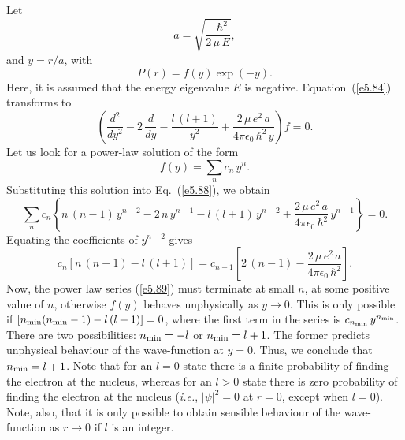 Let 
\begin{equation}\label{e5.86}
a= \sqrt{\frac{-\hbar^2}{2\,\mu \,E}},
\end{equation}
and $y=r/a$, with
  \begin{equation}\label{e5.87}
P(r) = f(y) \exp(-y).
\end{equation}
Here, it is assumed that the energy eigenvalue $E$ is negative.
Equation~(\ref{e5.84}) transforms to 
\begin{equation}\label{e5.88}
\left(\frac{d^2}{dy^2} -2\,\frac{d}{dy} -\frac{l\,(l+1)}{y^2}
+ \frac{2\,\mu\, e^2\, a}{4\pi \epsilon_0\, \hbar^2\,y}\right) f= 0.
\end{equation}
Let us look for a power-law solution of the form
\begin{equation}\label{e5.89}
f(y) = \sum_{n} c_n\, y^n.
\end{equation}
Substituting this solution into Eq.~(\ref{e5.88}), we obtain
\begin{equation}
\sum_n c_n \left\{ n\,(n-1)\,y^{n-2} - 2\,n\, y^{n-1} - l\,(l+1) \,y^{n-2} +
\frac{2\,\mu\, e^2 \,a}{4\pi \epsilon_0 \,\hbar^2}\, y^{n-1} \right\} = 0.
\end{equation}
Equating the coefficients of $y^{n-2}$ gives
\begin{equation}\label{e5.91}
c_n[ n\,(n-1) - l\,(l+1) ] = c_{n-1} \left [2\,(n-1) - \frac{2\,\mu\, e^2\, a}{4\pi \epsilon_0\, \hbar^2}\right].
\end{equation}
Now, the power law series (\ref{e5.89}) must terminate at small $n$, at some positive
value of $n$, otherwise $f(y)$ behaves unphysically as $y\rightarrow 0$. This
is only possible if $[n_{\rm min} (n_{\rm min} -1) - l\,(l+1) ] =0$, where
the first term in the series is $c_{n_{\rm min}}\,y^{n_{\rm min}}$. There
are two possibilities: $n_{\rm min} = -l$ or $n_{\rm min} = l+1$. The
former predicts  unphysical behaviour of the wave-function at $y=0$.
Thus, we conclude that $n_{\rm min} = l+1$. Note that for an $l=0$ state
there is a finite probability of finding the electron at the nucleus,
whereas for an $l>0$ state there is zero  probability of finding 
the electron at the nucleus ({\em i.e.}, $|\psi|^2 =0$ at $r=0$, except when
$l=0$). Note, also,  that it is only possible to obtain sensible behaviour of the
wave-function as $r\rightarrow 0$ if $l$ is an integer. 

